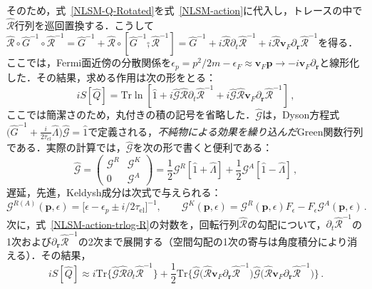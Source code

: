 \documentclass[a4paper,11pt]{ltjsarticle}
\def\Tr{\mathrm{Tr}}
\def\tauel{\tau_{\mathrm{el}}}
\begin{document}
そのため，式~\eqref{NLSM-Q-Rotated}を式~\eqref{NLSM-action}に代入し，トレースの中で$\hat{\mathcal{R}}$行列を巡回置換する．こうして$\hat{\mathcal{R}}\circ
\hat{G}^{-1}\circ\hat{\mathcal{R}}^{-1}=\hat{G}^{-1}+\hat{\mathcal{R}}
\circ[\hat{G}^{-1}\stackrel{\circ}{,}\hat{\mathcal{R}}^{-1}]
=\hat{G}^{-1}+i\hat{\mathcal{R}}\partial_{t}\hat{\mathcal{R}}^{-1}+
i\hat{\mathcal{R}}\mathbf{v}_{F}\partial_{\mathbf{r}}\hat{\mathcal{R}}^{-1}$を得る．ここでは，Fermi面近傍の分散関係を$\epsilon_{p}=p^{2}/2m-\epsilon_{F}\approx\mathbf{v}_{F}\mathbf{p}\to
-i\mathbf{v}_{F}\partial_{\mathbf{r}}$と線形化した．その結果，求める作用は次の形をとる：
\begin{equation}\label{NLSM-action-trlog-R}
iS[\hat Q]=\Tr\ln\left[\hat{1}+i\hat{\mathcal{G}}\hat{\mathcal{R}}
\partial_{t}\hat{\mathcal{R}}^{-1}+
i\hat{\mathcal{G}}\hat{\mathcal{R}}\mathbf{v}_{F}
\partial_{\mathbf{r}}\hat{\mathcal{R}}^{-1}\right]\,,
\end{equation}
ここでは簡潔さのため，丸付きの積の記号を省略した．$\hat{\mathcal{G}}$は，Dyson方程式$\big(\hat{G}^{-1}+\frac{i}{2\tauel}\hat{\Lambda}\big)\hat{\mathcal{G}}=\hat{1}$で定義される，{\em 不純物による効果を繰り込んだ}Green関数行列である．実際の計算では，$\hat{\mathcal{G}}$を次の形で書くと便利である：
\begin{equation}\label{NLSM-G-impurity-dressed}
\hat{\mathcal{G}}=\left(\begin{array}{cc}\mathcal{G}^{R} &
\mathcal{G}^{K}\\ 0 &
\mathcal{G}^{A}\end{array}\right)=\frac{1}{2}\mathcal{G}^{R}[\hat{1}+\hat{\Lambda}]+
\frac{1}{2}\mathcal{G}^{A}[\hat{1}-\hat{\Lambda}]\,,
\end{equation}
遅延，先進，Keldysh成分は次式で与えられる：
\begin{equation}\label{NLSM-G-impurity-dressed-RAK}
\mathcal{G}^{R(A)}(\mathbf{p},\epsilon)=\big[\epsilon-\epsilon_{p}\pm
i/2\tauel\big]^{-1},\qquad
\mathcal{G}^{K}(\mathbf{p},\epsilon)=\mathcal{G}^{R}(\mathbf{p},\epsilon)
F_{\epsilon}-F_{\epsilon}\mathcal{G}^{A}(\mathbf{p},\epsilon)\,.
\end{equation}
次に，式~\eqref{NLSM-action-trlog-R}の対数を，回転行列$\hat{\mathcal{R}}$の勾配について，$\partial_{t}\hat{\mathcal{R}}^{-1}$の1次および$\partial_{\mathbf{r}}\hat{\mathcal{R}}^{-1}$の2次まで展開する（空間勾配の1次の寄与は角度積分により消える）．その結果，
\begin{equation}\label{NLSM-action-trlog-Approx}
iS[\hat Q]\approx
i\Tr\big\{\hat{\mathcal{G}}\hat{\mathcal{R}}\partial_{t}\hat{\mathcal{R}}^{-1}\big\}
+\frac{1}{2}\Tr\big\{
\hat{\mathcal{G}}\big(\hat{\mathcal{R}}\mathbf{v}_{F}
\partial_{\mathbf{r}}\hat{\mathcal{R}}^{-1}\big)
\hat{\mathcal{G}}\big(\hat{\mathcal{R}}\mathbf{v}_{F}
\partial_{\mathbf{r}}\hat{\mathcal{R}}^{-1}\big)\big\}\,.
\end{equation}
\end{document}
